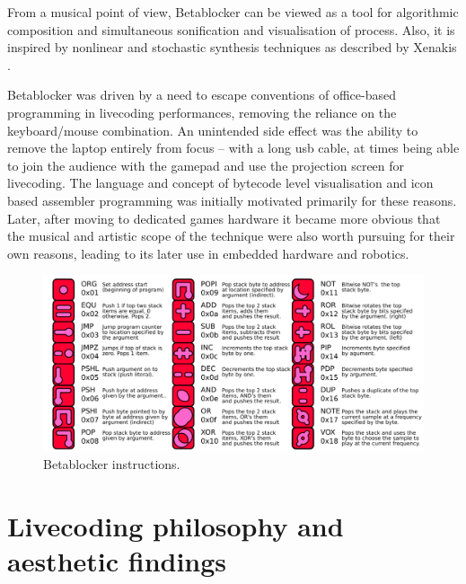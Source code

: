 \documentclass[letterpaper, 12pt]{article}
\begin{document}
From a musical point of view, Betablocker can be viewed as a tool for algorithmic composition \citep*{maurer1999-a-b} and simultaneous sonification and visualisation of process. Also, it is inspired by nonlinear and stochastic synthesis techniques as described by Xenakis \citep*{Xenakis:1971, luque2009-the}. 

Betablocker was driven by a need to escape conventions of office-based programming in livecoding performances, removing the reliance on the keyboard/mouse combination. An unintended side effect was the ability to remove the laptop entirely from focus -- with a long usb cable, at times being able to join the audience with the gamepad and use the projection screen for livecoding. The language and concept of bytecode level visualisation and icon based assembler programming was initially motivated primarily for these reasons. Later, after moving to dedicated games hardware it became more obvious that the musical and artistic scope of the technique were also worth pursuing for their own reasons, leading to its later use in embedded hardware and robotics.

\begin{figure}
	\centering
		\includegraphics[width=13cm]{bbds-legend}
	\caption{Betablocker instructions.}
	\label{fig:fig_bbds-legend}
\end{figure}
\parskip 18pt


\section{Livecoding philosophy and aesthetic findings}
\label{sec:distinct_character}


\end{document}
